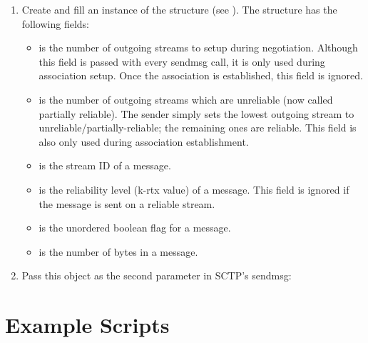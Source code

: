       \begin{enumerate}

	 \item Create and fill an instance of the 
	 structure (see ). The 
	 structure has the following fields:

	 \begin{itemize}

	    \item[]  is the number of outgoing streams
	    to setup during negotiation. Although this field is passed
	    with every sendmsg call, it is only used during association
	    setup. Once the association is established, this field is
	    ignored.

	    \item[]  is the number of outgoing
	    streams which are unreliable (now called partially
	    reliable). The sender simply sets the lowest outgoing stream
	    to unreliable/partially-reliable; the remaining ones are
	    reliable. This field is also only used during association
	    establishment.

	    \item[]  is the stream ID of a message.

	    \item[]  is the reliability level (k-rtx
	    value) of a message. This field is ignored if the message is
	    sent on a reliable stream.

	    \item[]  is the unordered boolean flag for a
	    message.

	    \item[]  is the number of bytes in a message.

	 \end{itemize}

	 \item Pass this object as the second parameter in SCTP's sendmsg:


      \end{enumerate}

   \section{Example Scripts}
   \label{sec:sctpExamples}

